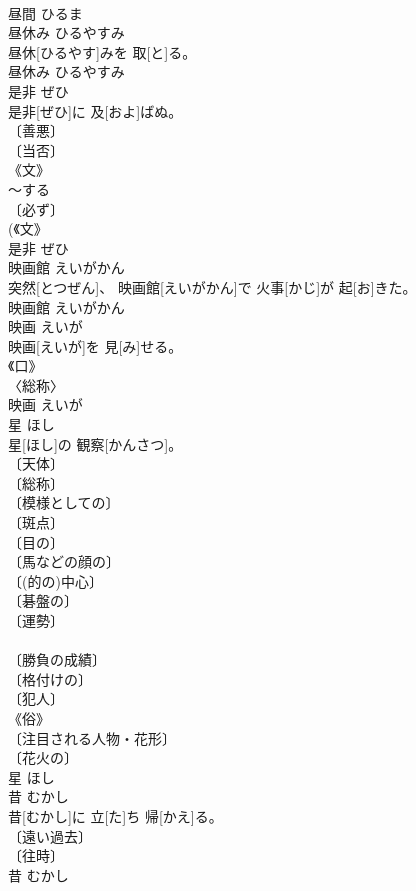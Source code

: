 \documentclass[8pt]{extreport}
\begin{document}
\begin{CJK}{UTF8}{min}
\\	昼間	ひるま	
\\	昼休み	ひるやすみ	
\\	昼休[ひるやす]みを 取[と]る。	
\\	昼休み	ひるやすみ	
\\	是非	ぜひ	
\\	是非[ぜひ]に 及[およ]ばぬ。	
\\	〔善悪〕 
\\	〔当否〕 
\\	《文》 
\\	～する 
\\	〔必ず〕 
\\	(《文》 
\\	是非	ぜひ	
\\	映画館	えいがかん	
\\	突然[とつぜん]、 映画館[えいがかん]で 火事[かじ]が 起[お]きた。	
\\	映画館	えいがかん	
\\	映画	えいが	
\\	映画[えいが]を 見[み]せる。	
\\	《口》 
\\	〈総称〉 
\\	映画	えいが	
\\	星	ほし	
\\	星[ほし]の 観察[かんさつ]。	
\\	〔天体〕 
\\	〔総称〕 
\\	〔模様としての〕 
\\	〔斑点〕 
\\	〔目の〕 
\\	〔馬などの顔の〕 
\\	〔(的の)中心〕 
\\	〔碁盤の〕 
\\	〔運勢〕 
\\	[⇒ほしうらない] 
\\	〔勝負の成績〕 
\\	〔格付けの〕 
\\	〔犯人〕 
\\	《俗》 
\\	〔注目される人物・花形〕 
\\	〔花火の〕 
\\	星	ほし	
\\	昔	むかし	
\\	昔[むかし]に 立[た]ち 帰[かえ]る。	
\\	〔遠い過去〕 
\\	〔往時〕 
\\	昔	むかし	

\end{CJK}
\end{document}
